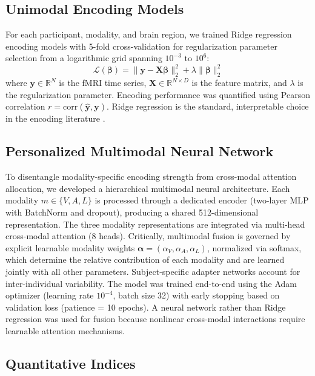 \documentclass[conference]{IEEEtran}
\begin{document}
\subsection{Unimodal Encoding Models}

For each participant, modality, and brain region, we trained Ridge regression encoding models with 5-fold cross-validation for regularization parameter selection from a logarithmic grid spanning $10^{-3}$ to $10^{6}$:
\begin{equation}\label{eq:L}
\mathcal{L}(\boldsymbol{\beta}) =
\lVert \mathbf{y} - \mathbf{X}\boldsymbol{\beta} \rVert_2^2
+ \lambda \lVert \boldsymbol{\beta} \rVert_2^2
\end{equation}
where $\mathbf{y} \in \mathbb{R}^N$ is the fMRI time series, $\mathbf{X} \in \mathbb{R}^{N \times D}$ is the feature matrix, and $\lambda$ is the regularization parameter. Encoding performance was quantified using Pearson correlation $r = \mathrm{corr}(\hat{\mathbf{y}}, \mathbf{y})$. Ridge regression is the standard, interpretable choice in the encoding literature \cite{naselaris2011encoding}.

\subsection{Personalized Multimodal Neural Network}

To disentangle modality-specific encoding strength from cross-modal attention allocation, we developed a hierarchical multimodal neural architecture. Each modality $m \in \{V, A, L\}$ is processed through a dedicated encoder (two-layer MLP with BatchNorm and dropout), producing a shared 512-dimensional representation. The three modality representations are integrated via multi-head cross-modal attention \cite{vaswani2017attention} (8 heads). Critically, multimodal fusion is governed by explicit learnable modality weights $\boldsymbol{\alpha} = (\alpha_V, \alpha_A, \alpha_L)$, normalized via softmax, which determine the relative contribution of each modality and are learned jointly with all other parameters. Subject-specific adapter networks account for inter-individual variability. The model was trained end-to-end using the Adam optimizer (learning rate $10^{-4}$, batch size 32) with early stopping based on validation loss (patience = 10 epochs). A neural network rather than Ridge regression was used for fusion because nonlinear cross-modal interactions require learnable attention mechanisms.

\subsection{Quantitative Indices}
\end{document}
